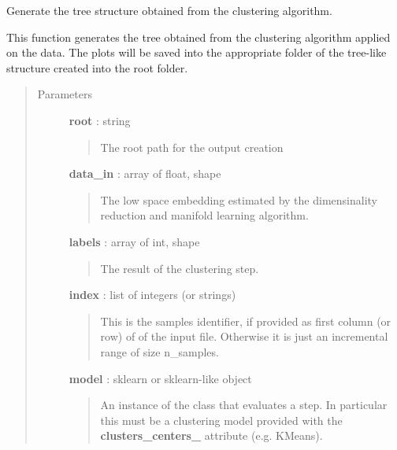 \documentclass[letterpaper,10pt,english]{sphinxmanual}
\begin{document}

\begin{fulllineitems}
\label{index:adenine.core.plotting.tree}
Generate the tree structure obtained from the clustering algorithm.

This function generates the tree obtained from the clustering algorithm
applied on the data. The plots will be saved into the appropriate folder of
the tree-like structure created into the root folder.
\begin{quote}\begin{description}
\item[{Parameters}] \leavevmode
\textbf{root} : string
\begin{quote}

The root path for the output creation
\end{quote}

\textbf{data\_in} : array of float, shape
\begin{quote}

The low space embedding estimated by the dimensinality reduction and
manifold learning algorithm.
\end{quote}

\textbf{labels} : array of int, shape
\begin{quote}

The result of the clustering step.
\end{quote}

\textbf{index} : list of integers (or strings)
\begin{quote}

This is the samples identifier, if provided as first column (or row) of
of the input file. Otherwise it is just an incremental range of size
n\_samples.
\end{quote}

\textbf{model} : sklearn or sklearn-like object
\begin{quote}

An instance of the class that evaluates a step. In particular this must
be a clustering model provided with the {\color{red}\bfseries{}clusters\_centers\_} attribute
(e.g. KMeans).
\end{quote}

\end{description}\end{quote}

\end{fulllineitems}
\end{document}

